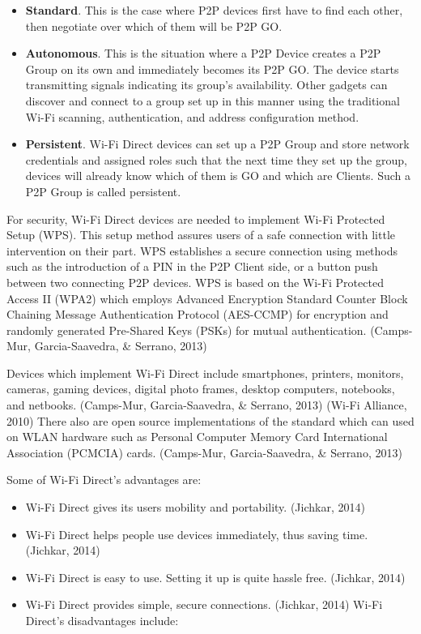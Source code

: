 \documentclass[12pt,svgnames,smaller]{article} %
\begin{document}
\begin{enumerate}
		\begin{itemize}
			\item \textbf{Standard}. This is the case where P2P devices first have to find each other, then negotiate over which of them will be P2P GO.
			\item \textbf{Autonomous}. This is the situation where a P2P Device creates a P2P Group on its own and immediately becomes its P2P GO. The device starts transmitting signals indicating its group’s availability. Other gadgets can discover and connect to a group set up in this manner using the traditional Wi-Fi scanning, authentication, and address configuration method.
			\item \textbf{Persistent}. Wi-Fi Direct devices can set up a P2P Group and store network credentials and assigned roles such that the next time they set up the group, devices will already know which of them is GO and which are Clients. Such a P2P Group is called persistent.
		\end{itemize}
		
		For security, Wi-Fi Direct devices are needed to implement Wi-Fi Protected Setup (WPS). This setup method assures users of a safe connection with little intervention on their part. WPS establishes a secure connection using methods such as the introduction of a PIN in the P2P Client side, or a button push between two connecting P2P devices. WPS is based on the Wi-Fi Protected Access II (WPA2) which employs Advanced Encryption Standard Counter Block Chaining Message Authentication Protocol (AES-CCMP) for encryption and randomly generated Pre-Shared Keys (PSKs) for mutual authentication. (Camps-Mur, Garcia-Saavedra, \& Serrano, 2013)
		
		Devices which implement Wi-Fi Direct include smartphones, printers, monitors, cameras, gaming devices, digital photo frames, desktop computers, notebooks, and netbooks. (Camps-Mur, Garcia-Saavedra, \& Serrano, 2013) (Wi-Fi Alliance, 2010) There also are open source implementations of the standard which can used on WLAN hardware such as Personal Computer Memory Card International Association (PCMCIA) cards. (Camps-Mur, Garcia-Saavedra, \& Serrano, 2013)
		
		Some of Wi-Fi Direct’s advantages are:
		
		\begin{itemize}
			\item Wi-Fi Direct gives its users mobility and portability. (Jichkar, 2014)
			\item Wi-Fi Direct helps people use devices immediately, thus saving time. (Jichkar, 2014)
			\item Wi-Fi Direct is easy to use. Setting it up is quite hassle free. (Jichkar, 2014)
			\item Wi-Fi Direct provides simple, secure connections. (Jichkar, 2014)
			Wi-Fi Direct’s disadvantages include:
		\end{itemize}
		

\end{enumerate}
\end{document}
